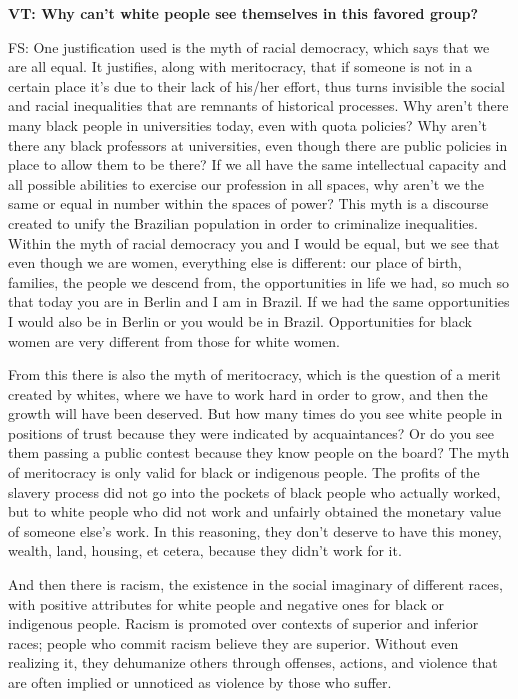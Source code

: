 \documentclass[a4paper,
fontsize=11pt,
oneside,
numbers=noperiodatend,
parskip=half-,
bibliography=totoc,
final
]{scrartcl}
\begin{document}
\textbf{VT: Why can't white people see themselves in this favored
group?}

FS: One justification used is the myth of racial democracy, which says
that we are all equal. It justifies, along with meritocracy, that if
someone is not in a certain place it's due to their lack of his/her
effort, thus turns invisible the social and racial inequalities that are
remnants of historical processes. Why aren't there many black people in
universities today, even with quota policies? Why aren't there any black
professors at universities, even though there are public policies in
place to allow them to be there? If we all have the same intellectual
capacity and all possible abilities to exercise our profession in all
spaces, why aren't we the same or equal in number within the spaces of
power? This myth is a discourse created to unify the Brazilian
population in order to criminalize inequalities. Within the myth of
racial democracy you and I would be equal, but we see that even though
we are women, everything else is different: our place of birth,
families, the people we descend from, the opportunities in life we had,
so much so that today you are in Berlin and I am in Brazil. If we had
the same opportunities I would also be in Berlin or you would be in
Brazil. Opportunities for black women are very different from those for
white women.

From this there is also the myth of meritocracy, which is the question
of a merit created by whites, where we have to work hard in order to
grow, and then the growth will have been deserved. But how many times do
you see white people in positions of trust because they were indicated
by acquaintances? Or do you see them passing a public contest because
they know people on the board? The myth of meritocracy is only valid for
black or indigenous people. The profits of the slavery process did not
go into the pockets of black people who actually worked, but to white
people who did not work and unfairly obtained the monetary value of
someone else's work. In this reasoning, they don't deserve to have this
money, wealth, land, housing, et cetera, because they didn't work for
it.

And then there is racism, the existence in the social imaginary of
different races, with positive attributes for white people and negative
ones for black or indigenous people. Racism is promoted over contexts of
superior and inferior races; people who commit racism believe they are
superior. Without even realizing it, they dehumanize others through
offenses, actions, and violence that are often implied or unnoticed as
violence by those who suffer.
\end{document}
